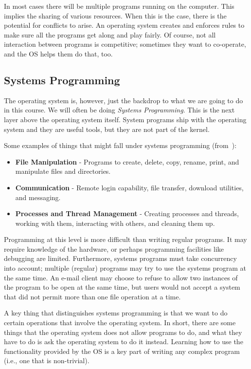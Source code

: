 In most cases there will be multiple programs running on the computer. This implies the sharing of various resources. When this is the case, there is the potential for conflicts to arise. An operating system creates and enforces rules to make sure all the programs get along and play fairly. Of course, not all interaction between programs is competitive; sometimes they want to co-operate, and the OS helps them do that, too.


\subsection*{Systems Programming}
The operating system is, however, just the backdrop to what we are going to do in this course. We will often be doing \textit{Systems Programming}. This is the next layer above the operating system itself. System programs ship with the operating system and they are useful tools, but they are not part of the kernel.

Some examples of things that might fall under systems programming (from~\cite{osc}):

\begin{itemize}
	\item \textbf{File Manipulation} - Programs to create, delete, copy, rename, print, and manipulate files and directories.
	\item \textbf{Communication} - Remote login capability, file transfer, download utilities, and messaging.
	\item \textbf{Processes and Thread Management} - Creating processes and threads, working with them, interacting with others, and cleaning them up.
\end{itemize}

Programming at this level is more difficult than writing regular programs. It may require knowledge of the hardware, or perhaps programming facilities like debugging are limited. Furthermore, systems programs must take concurrency into account; multiple (regular) programs may try to use the systems program at the same time. An e-mail client may choose to refuse to allow two instances of the program to be open at the same time, but users would not accept a system that did not permit more than one file operation at a time.

A key thing that distinguishes systems programming is that we want to do certain operations that involve the operating system. In short, there are some things that the operating system does not allow programs to do, and what they have to do is ask the operating system to do it instead. Learning how to use the functionality provided by the OS is a key part of writing any complex program (i.e., one that is non-trivial).

